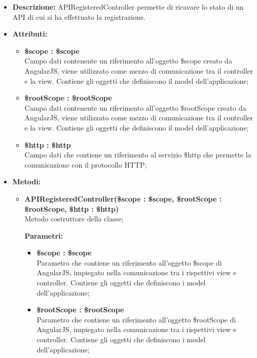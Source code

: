 \begin{itemize}
	\item \textbf{Descrizione:} APIRegisteredController permette di ricavare lo stato di un API di cui si ha effettuato la registrazione.
	\item \textbf{Attributi:}
	\begin{itemize}
		
		\item \textbf{\$scope : \$scope}\\
		Campo dati contenente un riferimento all'oggetto \$scope creato da AngularJS, viene utilizzato come mezzo di comunicazione tra il controller e la view. Contiene gli oggetti che definiscono il model dell'applicazione;
		
		\item \textbf{\$rootScope : \$rootScope}\\
		Campo dati contenente un riferimento all'oggetto \$rootScope creato da AngularJS, viene utilizzato come mezzo di comunicazione tra il controller e la view. Contiene gli oggetti che definiscono il model dell'applicazione;
		
		\item \textbf{\$http : \$http }\\
		Campo dati che contiene un riferimento al servizio \$http che permette la comunicazione con il protocollo HTTP;				
		
	\end{itemize}
	\item \textbf{Metodi:}
	\begin{itemize}
		
		\item \textbf{APIRegisteredController(\$scope : \$scope, \$rootScope : \$rootScope, \$http : \$http)}\\
		Metodo costruttore della classe;
		\begin{description}
			\item[\textbf{Parametri:}]
		\end{description}
		\begin{itemize}
			\item \textbf{\$scope : \$scope}\\
			Parametro che contiene un riferimento all'oggetto \$scope di AngularJS, impiegato nella comunicazione tra i rispettivi view e controller. Contiene gli oggetti che definiscono i model dell'applicazione;
			
			\item \textbf{\$rootScope : \$rootScope}\\
			Parametro che contiene un riferimento all'oggetto \$rootScope di AngularJS, impiegato nella comunicazione tra i rispettivi view e controller. Contiene gli oggetti che definiscono i model dell'applicazione;
			

\end{itemize}
\end{itemize}
\end{itemize}
